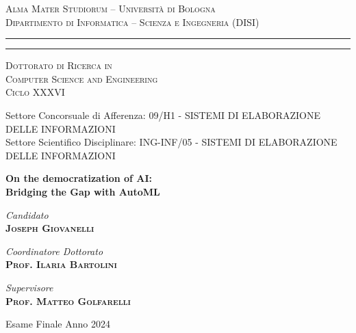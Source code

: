 \begin{titlepage}
%
%
\begin{center}
{{\Large{\textsc{Alma Mater Studiorum -- Università di Bologna}}\\\normalsize{\textsc{Dipartimento di Informatica -- Scienza e Ingegneria (DISI)}}}}
\rule[0.1cm]{15.8cm}{0.1mm}
\rule[0.5cm]{15.8cm}{0.6mm}
{\large{\textsc {Dottorato di Ricerca in\\Computer Science and Engineering}}\\
\vspace{3mm}
\normalsize{\textsc {Ciclo XXXVI}}}
\end{center}
%
\vspace{7mm}
%
%
\begin{footnotesize}
\centering
Settore Concorsuale di Afferenza: 09/H1 - SISTEMI DI ELABORAZIONE DELLE INFORMAZIONI\\
Settore Scientifico Disciplinare: ING-INF/05 - SISTEMI DI ELABORAZIONE DELLE INFORMAZIONI
\end{footnotesize}
%
\vfill
%
%
\begin{center}
{\LARGE\textbf{On the democratization of AI:}\\\vskip 1pt
\Large\textbf{Bridging the Gap with AutoML}}
\end{center}
%
\vfill
%
%
\begin{center}
{\large{\emph{Candidato}}\\
{\bf \textsc{Joseph Giovanelli}}}
\end{center}
%
\vskip 16pt
%
%
\begin{minipage}[t]{0.47\textwidth}
{\large{\emph{Coordinatore Dottorato}}\\
{\bf \textsc{Prof. Ilaria Bartolini}}}
\end{minipage}
\hfill
\begin{minipage}[t]{0.47\textwidth}\raggedleft
{\large{\emph{Supervisore}}\\
{\bf \textsc{Prof. Matteo Golfarelli}}}
\end{minipage}
%
\vfill
%
%
\begin{center}
{\large{\sc Esame Finale Anno 2024}}
\end{center}
%
\clearemptydoublepage

\end{titlepage}